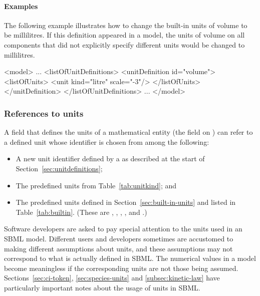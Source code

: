 \paragraph{Examples}

The following example illustrates how to change the built-in units
of volume to be millilitres.  If this definition appeared in a
model, the units of volume on all components that did not
explicitly specify different units would be changed to
millilitres.
\begin{example}
<model>
    ...
    <listOfUnitDefinitions>
        <unitDefinition id="volume">
            <listOfUnits>
                <unit kind="litre" scale="-3"/>
            </listOfUnits>
        </unitDefinition>
    </listOfUnitDefinitions>
    ...
</model>
\end{example}


\subsubsection{References to units}

A field that defines the units of a mathematical entity (\eg the
field  on \Parameter) can refer to a defined unit
whose identifier is chosen from among the following:
\begin{itemize}
  
\item A new unit identifier defined by a \UnitDefinition as
  described at the start of Section~\ref{sec:unitdefinitions};

\item The predefined units from Table~\vref{tab:unitkind}; and
  
\item The predefined units defined in
  Section~\ref{sec:built-in-units} and listed in
  Table~\ref{tab:builtin}.  (These are ,
  , , , and .)

\end{itemize}

Software developers are asked to pay special attention to the
units used in an SBML model.  Different users and developers
sometimes are accustomed to making different assumptions about
units, and these assumptions may not correspond to what is
actually defined in SBML.  The numerical values in a model become
meaningless if the corresponding units are not those being
assumed.  Sections~\ref{sec:ci-token}, \ref{sec:species-units} and
\ref{subsec:kinetic-law} have particularly important notes about
the usage of units in SBML.


